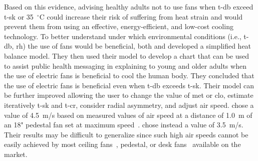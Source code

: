 Based on this evidence, advising healthy adults not to use fans when \ac{t-db} exceed \ac{t-sk} or 35~$^{\circ}$C could increase their risk of suffering from heat strain and would prevent them from using an effective, energy-efficient, and low-cost cooling technology.
To better understand under which environmental conditions (i.e., \ac{t-db}, \ac{rh}) the use of fans would be beneficial, both  and  developed a simplified heat balance model.
They then used their model to develop a chart that can be used to assist public health messaging in explaining to young and older adults when the use of electric fans is beneficial to cool the human body.
They concluded that the use of electric fans is beneficial even when \ac{t-db} exceeds \ac{t-sk}.
Their model can be further improved allowing the user to change the value of \ac{met} or \ac{clo}, estimate iteratively \ac{t-sk} and \ac{t-cr}, consider radial asymmetry, and adjust air speed.
 chose a value of 4.5~m/s based on measured values of air speed at a distance of 1.0~m of an 18" pedestal fan set at maximum speed~\cite{Jay2015}.
 chose instead a value of 3.5~m/s.
Their results may be difficult to generalize since such high air speeds cannot be easily achieved by most ceiling fans~\cite{Raftery2019}, pedestal, or desk fans~\cite{Yang2015a} available on the market.

